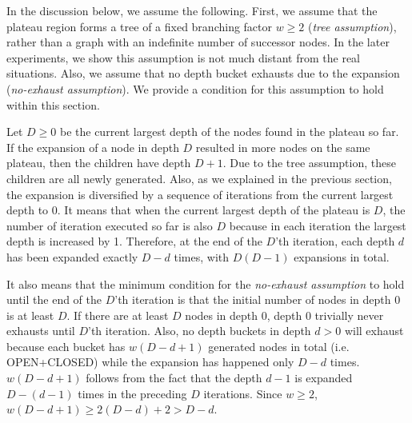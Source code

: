 
% 
In the discussion below, we assume the following.
First, we assume that the plateau region forms a tree of a fixed branching factor
$w\geq 2$ (\emph{tree assumption}), rather than a graph with an indefinite number of successor nodes.
In the later experiments, we show this assumption is not much distant from the real situations.
Also, we assume that no depth bucket exhausts due to the expansion (\emph{no-exhaust assumption}).
We provide a condition for this assumption to hold within this section.

Let $D\geq 0$ be the current largest depth of the nodes found in the plateau so far.  If the expansion of a node in
depth $D$ resulted in more nodes on the same plateau, then the children have depth $D+1$.  Due to the tree
assumption, these children are all newly generated. Also, as we explained in the previous section, the expansion is
diversified by a sequence of iterations from the current largest depth to 0.  It means that when the current
largest depth of the plateau is $D$, the number of iteration executed so far is also $D$ because
in each iteration the largest depth is increased by 1.
Therefore, at the end of the $D$'th iteration, each depth $d$ has been expanded exactly $D-d$ times, with $D(D-1)$
expansions in total.

It also means that the minimum condition for the \emph{no-exhaust assumption} to hold until the end of the $D$'th
iteration is that the initial number of nodes in depth 0 is at least $D$.  If there are at least $D$ nodes in depth
0, depth 0 trivially never exhausts until $D$'th iteration. Also, no depth buckets in depth $d>0$ will exhaust
because each bucket has $w(D-d+1)$ generated nodes in total (i.e. OPEN+CLOSED) while the expansion has
happened only $D-d$ times.
$w(D-d+1)$ follows from the fact that the depth $d-1$ is expanded $D-(d-1)$ times in the preceding $D$ iterations.
Since $w\geq 2$, $w(D-d+1)\geq 2(D-d)+2>D-d$.

